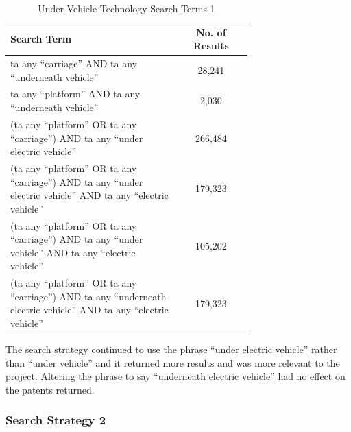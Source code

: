 \documentclass [12pt]{article}
\begin{document}
\begin{table}[H]
    \centering
    \setlength{\arrayrulewidth}{1.5pt}
    \begin{tabular}{|p{0.7\linewidth}|c|}
    \hline
    \cellcolor{gray!40}Search Term & \cellcolor{gray!40}No. of Results \\
    \hline
    ta any “carriage” AND ta any “underneath vehicle” & 28,241 \\
    \hline
    ta any “platform” AND ta any “underneath vehicle” & 2,030 \\
    \hline
    (ta any “platform” OR ta any “carriage”) AND ta any “under electric vehicle” & 266,484 \\
    \hline
    (ta any “platform” OR ta any “carriage”) AND ta any “under electric vehicle” AND ta any “electric vehicle” & 179,323 \\
    \hline
    (ta any “platform” OR ta any “carriage”) AND ta any “under vehicle” AND ta any “electric vehicle” & 105,202 \\
    \hline
    (ta any “platform” OR ta any “carriage”) AND ta any “underneath electric vehicle” AND ta any “electric vehicle” & 179,323 \\
    \hline
    \end{tabular}
    \caption{Under Vehicle Technology Search Terms 1}
    \label{table:under_vehicle__search_strat_1}
\end{table}

The search strategy continued to use the phrase “under electric vehicle” rather than “under vehicle” and it returned more results and was more relevant to the project. Altering the phrase to say “underneath electric vehicle” had no effect on the patents returned.

\subsubsection{Search Strategy 2}
\end{document}
